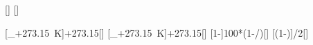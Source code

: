 [\degreeCelsius]
[\degreeCelsius]

[\vartheta_+\SI{273.15}{\kelvin}]{\twX+273.15}[\kelvin]
[\vartheta_+\SI{273.15}{\kelvin}]{\tkX+273.15}[\kelvin]
[1-]{100*(1-\TkX/\TwX)}[\percent]
[\left(1-\right)]{\etCX/2}[\percent]
